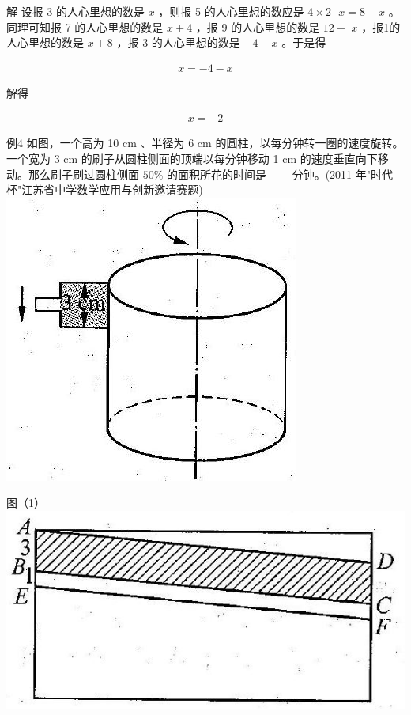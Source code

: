 \documentclass[10pt]{article}
\begin{document}
解 设报 3 的人心里想的数是 $x$ ，则报 5 的人心里想的数应是 $4 \times 2$ -$x=8-x$ 。同理可知报 7 的人心里想的数是 $x+4$ ，报 9 的人心里想的数是 $12-$ $x$ ，报1的人心里想的数是 $x+8$ ，报 3 的人心里想的数是 $-4-x$ 。于是得

\begin{align*}
x=-4-x
\end{align*}

解得

\begin{align*}
x=-2
\end{align*}

例4 如图，一个高为 10 cm 、半径为 6 cm 的圆柱，以每分钟转一圈的速度旋转。一个宽为 3 cm 的刷子从圆柱侧面的顶端以每分钟移动 1 cm 的速度垂直向下移动。那么刷子刷过圆柱侧面 $50 \%$ 的面积所花的时间是 $\qquad$分钟。(2011 年"时代杯"江苏省中学数学应用与创新邀请赛题)\\
\includegraphics[max width=\textwidth, center]{2024_10_30_26b590fd1106d28139f0g-021}

图（1）\\
\includegraphics[max width=\textwidth, center]{2024_10_30_26b590fd1106d28139f0g-021(1)}
\end{document}
